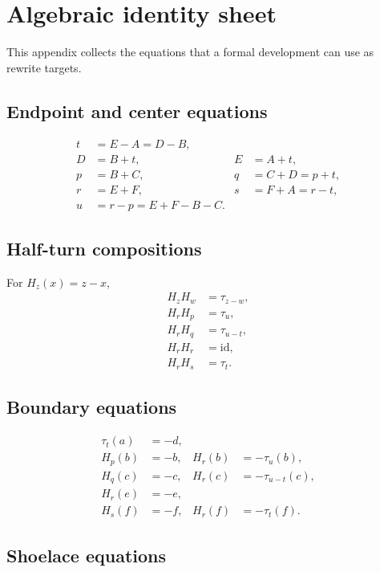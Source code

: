 \appendix
\section{Algebraic identity sheet}
\label{app:identities}

This appendix collects the equations that a formal development can use as rewrite targets.

\subsection{Endpoint and center equations}

\begin{align*}
 t&=E-A=D-B,\\
 D&=B+t, & E&=A+t,\\
 p&=B+C, & q&=C+D=p+t,\\
 r&=E+F, & s&=F+A=r-t,\\
 u&=r-p=E+F-B-C.
\end{align*}

\subsection{Half-turn compositions}

For \(H_z(x)=z-x\),
\begin{align*}
 H_zH_w&=\tau_{z-w},\\
 H_rH_p&=\tau_u,\\
 H_rH_q&=\tau_{u-t},\\
 H_rH_r&=\mathrm{id},\\
 H_rH_s&=\tau_t.
\end{align*}

\subsection{Boundary equations}

\begin{align*}
 \tau_t(a)&=-d,\\
 H_p(b)&=-b, & H_r(b)&=-\tau_u(b),\\
 H_q(c)&=-c, & H_r(c)&=-\tau_{u-t}(c),\\
 H_r(e)&=-e,\\
 H_s(f)&=-f, & H_r(f)&=-\tau_t(f).
\end{align*}

\subsection{Shoelace equations}

